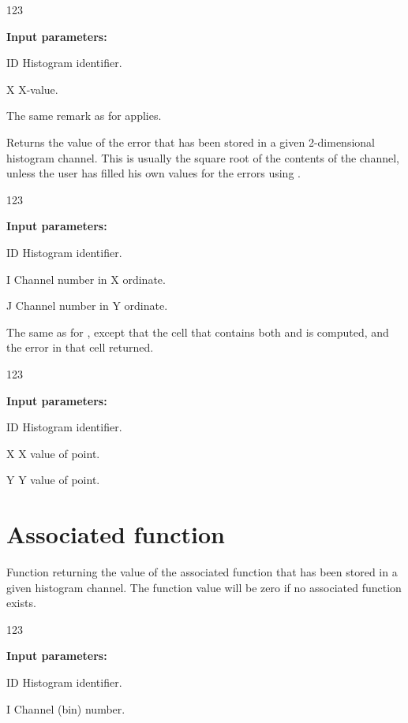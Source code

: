 \begin{DLtt}{123}
\item[{\rm\bf Input parameters:}]
\item[ID] Histogram identifier.
\item[X] X-value.
\end{DLtt}
The same remark as for  applies.


\Action
Returns the value of the error that has been stored in a given
2-dimensional histogram channel. This is usually the square root of the
contents of the channel, unless the user has filled his own values for the
errors using .

 \begin{DLtt}{123}
\item[{\rm\bf Input parameters:}]
\item[ID] Histogram identifier.
\item[I] Channel number in X ordinate.
\item[J] Channel number in Y ordinate.
\end{DLtt}


\Action
The same as for , except that the cell that contains both
 and  is computed, and the error in that cell returned.
 
\begin{DLtt}{123}
\item[{\rm\bf Input parameters:}]
\item[ID] Histogram identifier.
\item[X] X value of point.
\item[Y] Y value of point.
\end{DLtt}
 
\section{Associated function}
\label{HASSFUNC}
 
 
\Action
Function returning the value of the associated function that
has been stored in a given histogram channel. The function value will
be zero if no associated function exists.
 
\begin{DLtt}{123}
\item[{\rm\bf Input parameters:}]
\item[ID] Histogram identifier.
\item[I] Channel (bin) number.
\end{DLtt}
 
